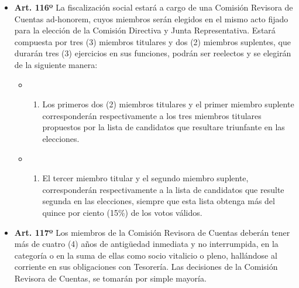 \documentclass[]{book}
\providecommand{\tightlist}{%
  \setlength{\itemsep}{0pt}\setlength{\parskip}{0pt}}
\begin{document}
\begin{itemize}
\tightlist
\item
  \textbf{Art. 116º}
  La fiscalización social estará a cargo de una Comisión Revisora de Cuentas ad-honorem, cuyos miembros serán elegidos en el mismo acto fijado para la elección de la Comisión Directiva y Junta Representativa. Estará compuesta por tres (3) miembros titulares y dos (2) miembros suplentes, que durarán tres (3) ejercicios en sus funciones, podrán ser reelectos y se elegirán de la siguiente manera:

  \begin{itemize}
  \item
    \begin{enumerate}
    \def\labelenumi{\alph{enumi})}
    \tightlist
    \item
      Los primeros dos (2) miembros titulares y el primer miembro suplente corresponderán respectivamente a los tres miembros titulares propuestos por la lista de candidatos que resultare triunfante en las elecciones.
    \end{enumerate}
  \item
    \begin{enumerate}
    \def\labelenumi{\alph{enumi})}
    \setcounter{enumi}{1}
    \tightlist
    \item
      El tercer miembro titular y el segundo miembro suplente, corresponderán respectivamente a la lista de candidatos que resulte segunda en las elecciones, siempre que esta lista obtenga más del quince por ciento (15\%) de los votos válidos.
    \end{enumerate}
  \end{itemize}
\end{itemize}

\begin{itemize}
\tightlist
\item
  \textbf{Art. 117º}
  Los miembros de la Comisión Revisora de Cuentas deberán tener más de cuatro (4) años de antigüedad inmediata y no interrumpida, en la categoría o en la suma de ellas como socio vitalicio o pleno, hallándose al corriente en sus obligaciones con Tesorería. Las decisiones de la Comisión Revisora de Cuentas, se tomarán por simple mayoría.
\end{itemize}
\end{document}
